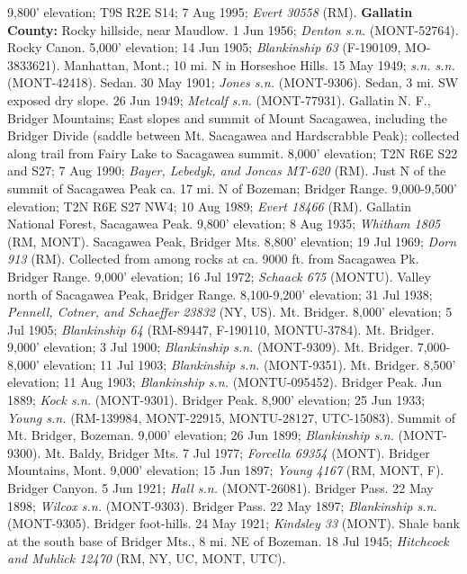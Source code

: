 9,800’ elevation; T9S R2E S14; 7 Aug 1995; \textit{Evert 30558} (RM).
  \textbf{Gallatin County:}
Rocky hillside, near Maudlow. 1 Jun 1956; \textit{Denton s.n.} (MONT-52764).
Rocky Canon. 5,000’ elevation; 14 Jun 1905;
\textit{Blankinship 63} (F-190109, MO-3833621).
Manhattan, Mont.; 10 mi. N in Horseshoe Hills. 15 May 1949;
\textit{s.n. s.n.} (MONT-42418).
Sedan. 30 May 1901; \textit{Jones s.n.} (MONT-9306).
Sedan, 3 mi. SW exposed dry slope. 26 Jun 1949;
\textit{Metcalf s.n.} (MONT-77931).
Gallatin N. F., Bridger Mountains; East slopes and summit of Mount Sacagawea,
including the Bridger Divide (saddle between Mt. Sacagawea and Hardscrabble
Peak); collected along trail from Fairy Lake to Sacagawea summit.
8,000’ elevation; T2N R6E S22 and S27; 7 Aug 1990;
\textit{Bayer, Lebedyk, and Joncas MT-620} (RM).
Just N of the summit of Sacagawea Peak ca. 17 mi. N of Bozeman; Bridger Range.
9,000-9,500’ elevation; T2N R6E S27 NW4; 10 Aug 1989; \textit{Evert 18466} (RM).
Gallatin National Forest, Sacagawea Peak. 9,800’ elevation; 8 Aug 1935;
\textit{Whitham 1805} (RM, MONT).
Sacagawea Peak, Bridger Mts. 8,800’ elevation; 19 Jul 1969;
\textit{Dorn 913} (RM).
Collected from among rocks at ca. 9000 ft. from Sacagawea Pk. Bridger Range.
9,000' elevation; 16 Jul 1972; \textit{Schaack 675} (MONTU).
Valley north of Sacagawea Peak, Bridger Range. 8,100-9,200’ elevation;
31 Jul 1938; \textit{Pennell, Cotner, and Schaeffer 23832} (NY, US).
Mt. Bridger. 8,000’ elevation; 5 Jul 1905; \textit{Blankinship 64}
(RM-89447, F-190110, MONTU-3784).
Mt. Bridger. 9,000’ elevation; 3 Jul 1900;
\textit{Blankinship s.n.} (MONT-9309).
Mt. Bridger. 7,000-8,000’ elevation; 11 Jul 1903;
\textit{Blankinship s.n.} (MONT-9351).
Mt. Bridger. 8,500' elevation; 11 Aug 1903; \textit{Blankinship s.n.}
(MONTU-095452).
Bridger Peak. Jun 1889; \textit{Kock s.n.} (MONT-9301).
Bridger Peak. 8,900’ elevation; 25 Jun 1933;
\textit{Young s.n.} (RM-139984, MONT-22915, MONTU-28127, UTC-15083).
Summit of Mt. Bridger, Bozeman. 9,000’ elevation; 26 Jun 1899;
\textit{Blankinship s.n.} (MONT-9300).
Mt. Baldy, Bridger Mts. 7 Jul 1977; \textit{Forcella 69354} (MONT).
Bridger Mountains, Mont. 9,000’ elevation; 15 Jun 1897;
\textit{Young 4167} (RM, MONT, F).
Bridger Canyon. 5 Jun 1921; \textit{Hall s.n.} (MONT-26081).
Bridger Pass. 22 May 1898; \textit{Wilcox s.n.} (MONT-9303).
Bridger Pass. 22 May 1897; \textit{Blankinship s.n.} (MONT-9305).
Bridger foot-hills. 24 May 1921; \textit{Kindsley 33} (MONT).
Shale bank at the south base of Bridger Mts., 8 mi. NE of Bozeman. 18 Jul 1945;
\textit{Hitchcock and Muhlick 12470} (RM, NY, UC, MONT, UTC).
